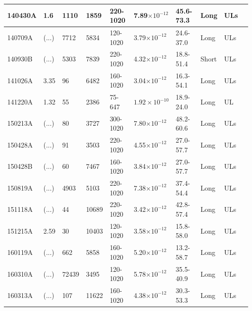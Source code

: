 \begin{longtable}{llllllllll}
                \midrule
140430A & 1.6 & 1110 & 1859 & 220-1020  & 7.89$\times10^{-12}$  & 45.6-73.3 & Long & ULs & \cite{2025AeA...700A..96A}  \\
                \midrule
140709A & (...)  & 7712 & 5834 & 120-1020 & 3.79$\times10^{-12}$    & 24.6-37.0 & Long & ULs & \cite{2025AeA...700A..96A}  \\
                \midrule
140930B & (...)  & 5303 & 7839 & 220-1020 & 4.32$\times10^{-12}$  & 18.8-51.4 & Short & ULs & \cite{2025AeA...700A..96A}  \\
                \midrule
141026A & 3.35 & 96 & 6482 & 160-1020  & 3.04$\times10^{-12}$  & 16.3-54.1 & Long & ULs & \cite{2025AeA...700A..96A}  \\
                \midrule
141220A & 1.32 & 55 & 2386 & 75-647   & $1.92 \times10^{-10}$  & 18.9-24.0 & Long & UL & \cite{2025AeA...700A..96A}  \\
                \midrule
150213A & (...)  & 80 & 3727 & 300-1020  & 7.80$\times10^{-12}$    & 48.2-60.6 & Long & ULs & \cite{2025AeA...700A..96A}  \\
                \midrule
150428A & (...)  & 91 & 3503 & 220-1020 &  4.55$\times10^{-12}$   & 27.0-57.7 & Long & ULs & \cite{2025AeA...700A..96A}  \\
                \midrule
150428B & (...)  & 60 & 7467 & 160-1020 &  3.84$\times10^{-12}$  & 27.0-57.7 & Long& ULs & \cite{2025AeA...700A..96A}  \\
                \midrule
150819A & (...)  & 4903 & 5103 &  220-1020  & 7.38$\times10^{-12}$  & 37.4-54.4 & Long & ULs & \cite{2025AeA...700A..96A}  \\
                \midrule
151118A & (...)  & 44 & 10689 &220-1020  & 3.42$\times10^{-12}$  & 42.8-57.4 & Long & ULs & \cite{2025AeA...700A..96A}  \\
                \midrule
151215A & 2.59 & 30 & 10403 &  120-1020  & 3.58$\times10^{-12}$  & 15.8-58.0 & Long  & ULs & \cite{2025AeA...700A..96A}  \\
                \midrule
160119A & (...) & 662 & 5858 & 160-1020 & 5.20$\times10^{-12}$   & 13.2-58.7 & Long & ULs & \cite{2025AeA...700A..96A}  \\
                \midrule
160310A & (...)  & 72439 & 3495 &  120-1020  & 5.78$\times10^{-12}$ & 35.5-40.9 & Long & ULs & \cite{2025AeA...700A..96A}  \\
                \midrule
160313A & (...)  & 107 & 11622 & 160-1020 &  4.38$\times10^{-12}$  & 30.3-53.3 & Long & ULs & \cite{2025AeA...700A..96A}  \\

\end{longtable}
